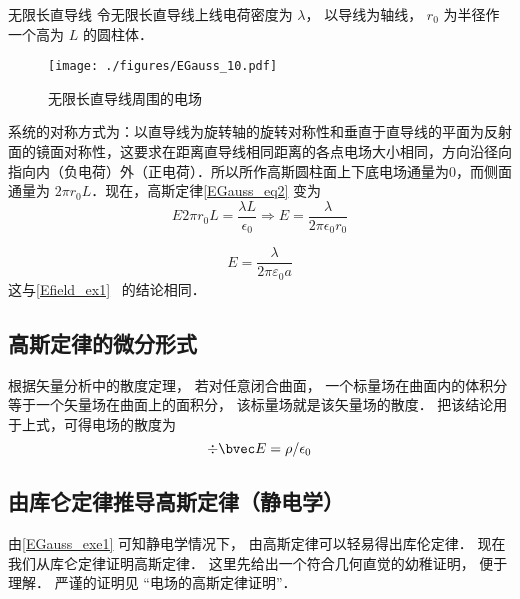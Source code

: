\begin{example}{无限长直导线}
令无限长直导线上线电荷密度为 $\lambda$， 以导线为轴线， $r_0$ 为半径作一个高为 $L$ 的圆柱体． 
\begin{figure}[ht]
\centering
\texttt{[image: ./figures/EGauss\_10.pdf]}
\caption{无限长直导线周围的电场} \label{EGauss_fig10}
\end{figure}
系统的对称方式为：以直导线为旋转轴的旋转对称性和垂直于直导线的平面为反射面的镜面对称性，这要求在距离直导线相同距离的各点电场大小相同，方向沿径向指向内（负电荷）外（正电荷）．所以所作高斯圆柱面上下底电场通量为0，而侧面通量为 $2\pi r_0L$．现在，高斯定律\autoref{EGauss_eq2} 变为
\begin{equation}
E2\pi r_0L=\frac{\lambda L}{\epsilon_0}\Rightarrow E=\frac{\lambda}{2\pi \epsilon_0r_0 }
\end{equation}


\begin{equation}
E=\frac{\lambda}{2 \pi \varepsilon_{0} a}
\end{equation}
这与\autoref{Efield_ex1}~ 的结论相同．
\end{example}

\subsection{高斯定律的微分形式}

根据矢量分析中的散度定理， 若对任意闭合曲面， 一个标量场在曲面内的体积分等于一个矢量场在曲面上的面积分， 该标量场就是该矢量场的散度． 把该结论用于上式，可得电场的散度为
\begin{equation}
\div \bvec E = \rho / \epsilon_0
\end{equation}

\subsection{由库仑定律推导高斯定律（静电学）}
由\autoref{EGauss_exe1} 可知静电学情况下， 由高斯定律可以轻易得出库伦定律． 现在我们从库仑定律证明高斯定律． 这里先给出一个符合几何直觉的幼稚证明， 便于理解． 严谨的证明见 “电场的高斯定律证明”．

